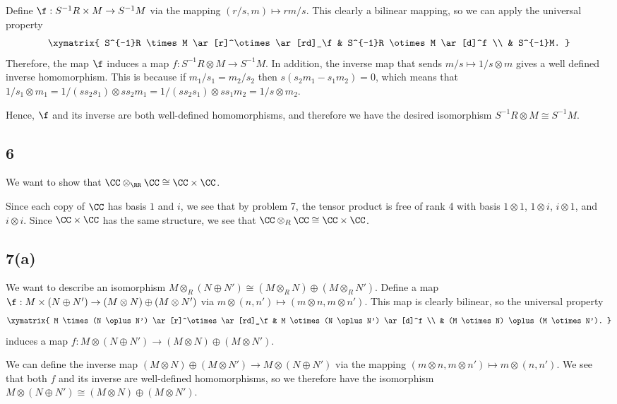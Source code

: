 \documentclass[12pt, reqno]{amsart}
\begin{document}
Define $\f: S^{-1} R \times M \to S^{-1}M$ via the mapping 
$(r/s, m) \mapsto rm/s$. This clearly a bilinear mapping, so we can apply the
universal property 
\[ 
\xymatrix{
S^{-1}R \times M \ar[r]^\otimes \ar[rd]_\f
	& S^{-1}R \otimes M \ar[d]^f \\
& S^{-1}M.
}
\] 
Therefore, the map $\f$ induces a map $f: S^{-1}R \otimes M \to S^{-1}M$.
In addition, the inverse map that sends $m/s \mapsto 1/s \otimes m$
gives  a well defined inverse homomorphism.
This is because if $m_1/s_1 = m_2/s_2$ then $s (s_2 m_1 - s_1 m_2) = 0$, which
means that 
$1 / s_1 \otimes m_1 
= 1 / (s s_2 s_1) \otimes s s_2 m_1  
= 1 / (s s_2 s_1) \otimes s s_1 m_2 = 1/s \otimes m_2$.

Hence, $\f$ and its inverse are both well-defined homomorphisms, and therefore
we have the desired isomorphism $S^{-1}R \otimes M \cong S^{-1}M$.

\subsection*{6}

We want to show that $\CC \otimes_\RR \CC \cong \CC \times \CC$.

Since each copy of $\CC$ has basis $1$ and $i$, we see that by 
problem 7, 
the tensor product is free of rank 4 with basis $1 \otimes 1$, $1 \otimes i$,
$i \otimes 1$, and $i \otimes i$. 
Since $\CC \times \CC$ 
has the same structure, we see that $\CC \otimes_R \CC \cong \CC \times \CC$.


\subsection*{7(a)}
We want to describe an isomorphism 
$M \otimes_R (N \oplus N') \cong (M \otimes_R N) \oplus (M \otimes_R N')$.
Define a map 
$\f : M \times (N \oplus N') \to (M \otimes N) \oplus (M \otimes N')$ via
$m \otimes (n, n') \mapsto (m \otimes n, m \otimes n')$.
This map is clearly bilinear, so the universal property 
\[ 
\xymatrix{
M \times (N \oplus N') \ar[r]^\otimes \ar[rd]_\f
	& M \otimes (N \oplus N') \ar[d]^f \\
& (M \otimes N) \oplus (M \otimes N').
}
\] 
induces a map
$f : M \otimes (N \oplus N') \to (M \otimes N) \oplus (M \otimes N')$.

We can define the inverse map
$(M \otimes N) \oplus (M \otimes N') \to M \otimes (N \oplus N')$ via 
the mapping
$(m \otimes n, m \otimes n') \mapsto m \otimes (n, n')$. We see that
both $f$ and its inverse are well-defined homomorphisms, so 
we therefore have the isomorphism
$M \otimes (N \oplus N') \cong (M \otimes N) \oplus (M \otimes N')$.
\end{document}
